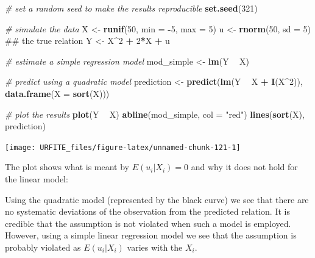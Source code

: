 \documentclass[]{book}
\newenvironment{Shaded}{\begin{snugshade}}{\end{snugshade}}
\newcommand{\KeywordTok}[1]{\textcolor[rgb]{0.13,0.29,0.53}{\textbf{#1}}}
\newcommand{\DataTypeTok}[1]{\textcolor[rgb]{0.13,0.29,0.53}{#1}}
\newcommand{\DecValTok}[1]{\textcolor[rgb]{0.00,0.00,0.81}{#1}}
\newcommand{\StringTok}[1]{\textcolor[rgb]{0.31,0.60,0.02}{#1}}
\newcommand{\CommentTok}[1]{\textcolor[rgb]{0.56,0.35,0.01}{\textit{#1}}}
\newcommand{\OperatorTok}[1]{\textcolor[rgb]{0.81,0.36,0.00}{\textbf{#1}}}
\newcommand{\NormalTok}[1]{#1}
\theoremstyle{definition}
\theoremstyle{definition}
\theoremstyle{definition}
\theoremstyle{remark}
\begin{document}
\begin{Shaded}
\begin{Highlighting}[]
\CommentTok{# set a random seed to make the results reproducible}
\KeywordTok{set.seed}\NormalTok{(}\DecValTok{321}\NormalTok{)}

\CommentTok{# simulate the data }
\NormalTok{X <-}\StringTok{ }\KeywordTok{runif}\NormalTok{(}\DecValTok{50}\NormalTok{, }\DataTypeTok{min =} \OperatorTok{-}\DecValTok{5}\NormalTok{, }\DataTypeTok{max =} \DecValTok{5}\NormalTok{)}
\NormalTok{u <-}\StringTok{ }\KeywordTok{rnorm}\NormalTok{(}\DecValTok{50}\NormalTok{, }\DataTypeTok{sd =} \DecValTok{5}\NormalTok{)  }
\NormalTok{## the true relation  }
\NormalTok{Y <-}\StringTok{ }\NormalTok{X}\OperatorTok{^}\DecValTok{2} \OperatorTok{+}\StringTok{ }\DecValTok{2}\OperatorTok{*}\NormalTok{X }\OperatorTok{+}\StringTok{ }\NormalTok{u                }

\CommentTok{# estimate a simple regression model }
\NormalTok{mod_simple <-}\StringTok{ }\KeywordTok{lm}\NormalTok{(Y }\OperatorTok{~}\StringTok{ }\NormalTok{X)}

\CommentTok{# predict using a quadratic model }
\NormalTok{prediction <-}\StringTok{ }\KeywordTok{predict}\NormalTok{(}\KeywordTok{lm}\NormalTok{(Y }\OperatorTok{~}\StringTok{ }\NormalTok{X }\OperatorTok{+}\StringTok{  }\KeywordTok{I}\NormalTok{(X}\OperatorTok{^}\DecValTok{2}\NormalTok{)), }\KeywordTok{data.frame}\NormalTok{(}\DataTypeTok{X =} \KeywordTok{sort}\NormalTok{(X)))}

\CommentTok{# plot the results}
\KeywordTok{plot}\NormalTok{(Y }\OperatorTok{~}\StringTok{ }\NormalTok{X)}
\KeywordTok{abline}\NormalTok{(mod_simple, }\DataTypeTok{col =} \StringTok{"red"}\NormalTok{)}
\KeywordTok{lines}\NormalTok{(}\KeywordTok{sort}\NormalTok{(X), prediction)}
\end{Highlighting}
\end{Shaded}

\begin{center}\texttt{[image: URFITE\_files/figure-latex/unnamed-chunk-121-1]} \end{center}

The plot shows what is meant by \(E(u_i|X_i) = 0\) and why it does not
hold for the linear model:

Using the quadratic model (represented by the black curve) we see that
there are no systematic deviations of the observation from the predicted
relation. It is credible that the assumption is not violated when such a
model is employed. However, using a simple linear regression model we
see that the assumption is probably violated as \(E(u_i|X_i)\) varies
with the \(X_i\).
\end{document}
